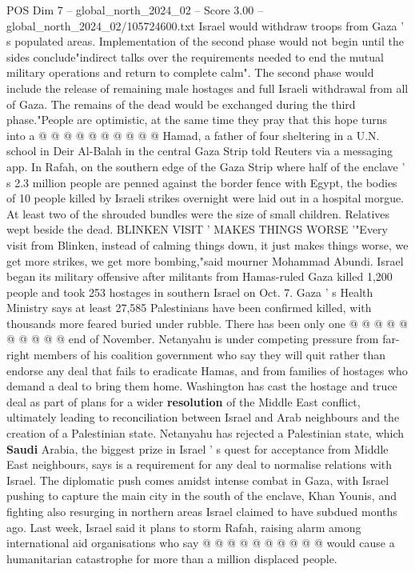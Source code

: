 \begin{textsample}{POS Dim 7 – global\_north\_2024\_02 – Score 3.00 – global\_north\_2024\_02/105724600.txt}
Israel would withdraw troops from Gaza ' s populated areas.
Implementation of the second phase would not begin until the sides conclude"indirect talks over the requirements needed to end the mutual military operations and return to complete calm".
The second phase would include the release of remaining male hostages and full Israeli withdrawal from all of Gaza.
The remains of the dead would be exchanged during the third phase."People are optimistic, at the same time they pray that this hope turns into a @ @ @ @ @ @ @ @ @ @ Hamad, a father of four sheltering in a U.N. school in Deir Al-Balah in the central Gaza Strip told Reuters via a messaging app.
In Rafah, on the southern edge of the Gaza Strip where half of the enclave ' s 2.3 million people are penned against the border fence with Egypt, the bodies of 10 people killed by Israeli strikes overnight were laid out in a hospital morgue.
At least two of the shrouded bundles were the size of small children.
Relatives wept beside the dead.
BLINKEN VISIT ' MAKES THINGS WORSE '"Every visit from Blinken, instead of calming things down, it just makes things worse, we get more strikes, we get more bombing,"said mourner Mohammad Abundi.
Israel began its military offensive after militants from Hamas-ruled Gaza killed 1,200 people and took 253 hostages in southern Israel on Oct. 7.
Gaza ' s Health Ministry says at least 27,585 Palestinians have been confirmed killed, with thousands more feared buried under rubble.
There has been only one @ @ @ @ @ @ @ @ @ @ end of November.
Netanyahu is under competing pressure from far-right members of his coalition government who say they will quit rather than endorse any deal that fails to eradicate Hamas, and from families of hostages who demand a deal to bring them home.
Washington has cast the hostage and truce deal as part of plans for a wider \textbf{resolution} of the Middle East conflict, ultimately leading to reconciliation between Israel and Arab neighbours and the creation of a Palestinian state.
Netanyahu has rejected a Palestinian state, which \textbf{Saudi} Arabia, the biggest prize in Israel ' s quest for acceptance from Middle East neighbours, says is a requirement for any deal to normalise relations with Israel.
The diplomatic push comes amidst intense combat in Gaza, with Israel pushing to capture the main city in the south of the enclave, Khan Younis, and fighting also resurging in northern areas Israel claimed to have subdued months ago.
Last week, Israel said it plans to storm Rafah, raising alarm among international aid organisations who say @ @ @ @ @ @ @ @ @ @ would cause a humanitarian catastrophe for more than a million displaced people.

\end{textsample}
